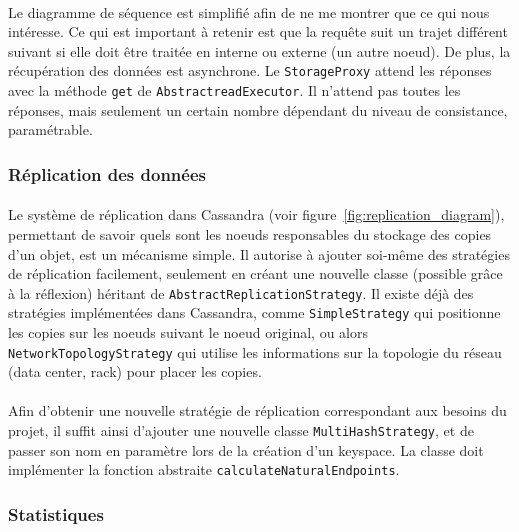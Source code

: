 \documentclass[12pt]{article}
\newcommand{\class}[1]{\texttt{#1}}
\begin{document}
\paragraph{}Le diagramme de séquence est simplifié afin de ne me montrer que ce qui nous intéresse. Ce qui est important à retenir est que la requête suit un trajet différent suivant si elle doit être traitée en interne ou externe (un autre noeud). De plus, la récupération des données est asynchrone. Le \class{StorageProxy} attend les réponses avec la méthode \texttt{get} de \class{AbstractreadExecutor}. Il n'attend pas toutes les réponses, mais seulement un certain nombre dépendant du niveau de consistance, paramétrable.

\subsubsection{Réplication des données}

\paragraph{}Le système de réplication dans Cassandra (voir figure~\ref{fig:replication_diagram}), permettant de savoir quels sont les noeuds responsables du stockage des copies d'un objet, est un mécanisme simple. Il autorise à ajouter soi-même des stratégies de réplication facilement, seulement en créant une nouvelle classe (possible grâce à la réflexion) héritant de \class{AbstractReplicationStrategy}. Il existe déjà des stratégies implémentées dans Cassandra, comme \class{SimpleStrategy} qui positionne les copies sur les noeuds suivant le noeud original, ou alors \class{NetworkTopologyStrategy} qui utilise les informations sur la topologie du réseau (data center, rack) pour placer les copies.

\paragraph{}Afin d'obtenir une nouvelle stratégie de réplication correspondant aux besoins du projet, il suffit ainsi d'ajouter une nouvelle classe \class{MultiHashStrategy}, et de passer son nom en paramètre lors de la création d'un keyspace. La classe doit implémenter la fonction abstraite \texttt{calculateNaturalEndpoints}.

\subsubsection{Statistiques}
\end{document}
